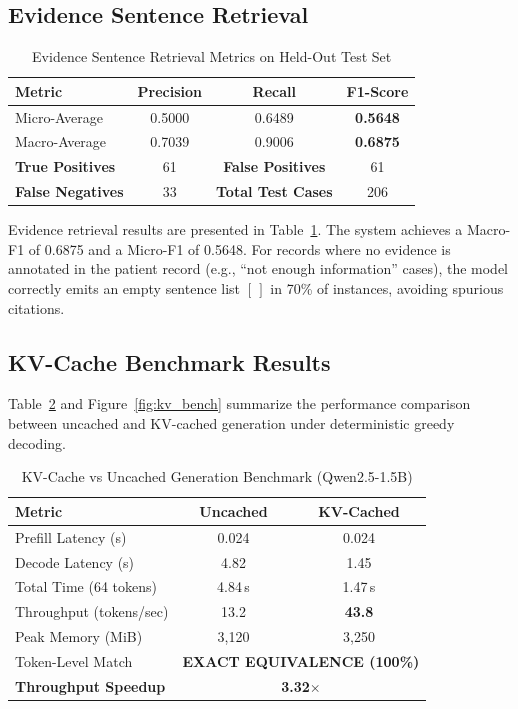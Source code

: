 \documentclass[conference]{IEEEtran}
\begin{document}
\subsection{Evidence Sentence Retrieval}

\begin{table}[htbp]
\centering
\caption{Evidence Sentence Retrieval Metrics on Held-Out Test Set}
\label{tab:evidence}
\begin{tabular}{lccc}
\toprule
\textbf{Metric} & \textbf{Precision} & \textbf{Recall} & \textbf{F1-Score} \\
\midrule
Micro-Average & 0.5000 & 0.6489 & \textbf{0.5648} \\
Macro-Average & 0.7039 & 0.9006 & \textbf{0.6875} \\
\midrule
\textbf{True Positives} & 61 & \textbf{False Positives} & 61 \\
\textbf{False Negatives} & 33 & \textbf{Total Test Cases} & 206 \\
\bottomrule
\end{tabular}
\end{table}

Evidence retrieval results are presented in Table~\ref{tab:evidence}. The system achieves a Macro-F1 of 0.6875 and a Micro-F1 of 0.5648. For records where no evidence is annotated in the patient record (e.g., ``not enough information'' cases), the model correctly emits an empty sentence list $[\,]$ in 70\% of instances, avoiding spurious citations.

\subsection{KV-Cache Benchmark Results}

Table~\ref{tab:kvcache} and Figure~\ref{fig:kv_bench} summarize the performance comparison between uncached and KV-cached generation under deterministic greedy decoding.

\begin{table}[htbp]
\centering
\caption{KV-Cache vs Uncached Generation Benchmark (Qwen2.5-1.5B)}
\label{tab:kvcache}
\begin{tabular}{lcc}
\toprule
\textbf{Metric} & \textbf{Uncached} & \textbf{KV-Cached} \\
\midrule
Prefill Latency (s) & 0.024 & 0.024 \\
Decode Latency (s) & 4.82 & 1.45 \\
Total Time (64 tokens) & 4.84\,s & 1.47\,s \\
Throughput (tokens/sec) & 13.2 & \textbf{43.8} \\
Peak Memory (MiB) & 3,120 & 3,250 \\
Token-Level Match & \multicolumn{2}{c}{\textbf{EXACT EQUIVALENCE (100\%)}} \\
\midrule
\textbf{Throughput Speedup} & \multicolumn{2}{c}{\textbf{3.32$\times$}} \\
\bottomrule
\end{tabular}
\end{table}
\end{document}
